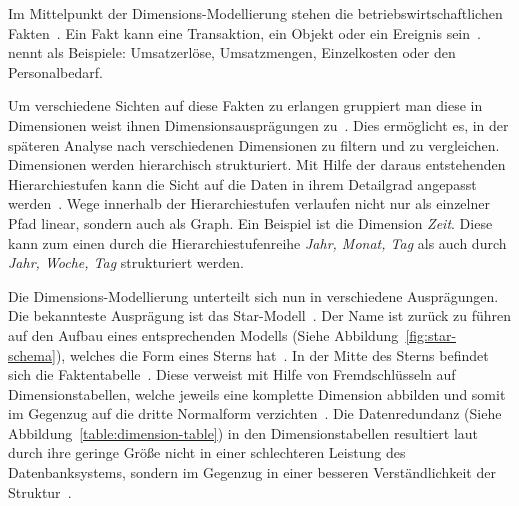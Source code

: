 \documentclass[
  language=german, %
  type=bachelor%
]{isthesis}
\begin{document}
\begin{content}
  Im Mittelpunkt der Dimensions-Modellierung stehen die
  betriebswirtschaftlichen Fakten~\cite[][S.  2]{phipps2002automating}. Ein
  Fakt kann eine Transaktion, ein Objekt oder ein Ereignis sein~\cite[][S.
  42]{ballard1998data}. \textsc{\citeauthor{Kemper2010}} nennt als Beispiele:
  \glqq{}Umsatzerlöse, Umsatzmengen, Einzelkosten oder den
  Personalbedarf\grqq{}\cite[][S. 66]{Kemper2010}. 
  
  Um verschiedene Sichten auf diese Fakten zu erlangen gruppiert man diese in
  Dimensionen \bzw{} weist ihnen Dimensionsausprägungen zu~\cite[][S.
  66]{Kemper2010}. Dies ermöglicht es, in der späteren Analyse nach
  verschiedenen Dimensionen zu filtern und zu vergleichen. Dimensionen werden
  hierarchisch strukturiert. Mit Hilfe der daraus entstehenden Hierarchiestufen
  kann die Sicht auf die Daten in ihrem Detailgrad angepasst werden~\cite[][S.
  66]{Kemper2010}. Wege innerhalb der Hierarchiestufen verlaufen nicht nur als
  einzelner Pfad linear, sondern auch als Graph. Ein Beispiel ist die
  Dimension \textit{Zeit}.  Diese kann zum einen durch die
  Hierarchiestufenreihe \textit{Jahr, Monat, Tag} als auch durch \textit{Jahr,
  Woche, Tag} strukturiert werden.

  Die Dimensions-Modellierung unterteilt sich nun in verschiedene Ausprägungen.
  Die bekannteste Ausprägung ist das Star-Modell~\cite[][S.
  2]{phipps2002automating}. Der Name ist zurück zu f\"uhren auf den Aufbau
  eines entsprechenden Modells (Siehe Abbildung~\ref{fig:star-schema}), welches
  die Form eines Sterns hat~\cite[][S.  44]{Kimball2013}. In der Mitte des
  Sterns befindet sich die Faktentabelle~\cite[][S. 67]{Kemper2010}. Diese
  verweist mit Hilfe von Fremdschlüsseln auf Dimensionstabellen, welche jeweils
  eine komplette Dimension abbilden und somit im Gegenzug auf die dritte
  Normalform verzichten~\cite[][S. 67 f.]{Kemper2010}. Die
  Datenredundanz (Siehe Abbildung~\ref{table:dimension-table}) in den
  Dimensionstabellen resultiert laut \textsc{\citeauthor{Kimball2013}} durch
  ihre geringe Größe nicht in einer schlechteren Leistung des Datenbanksystems,
  sondern im Gegenzug in einer besseren Verständlichkeit der
  Struktur~\cite[][S. 15]{Kimball2013}.

  \begin{figure}[caption={Star-Schema Beispielmodell angelehnt an~\cite{Kemper2010} Abb. 2.30}, label={fig:star-schema}]
    \resizebox{\columnwidth-90pt}{!}{}
  \end{figure}


\end{content}
\end{document}
